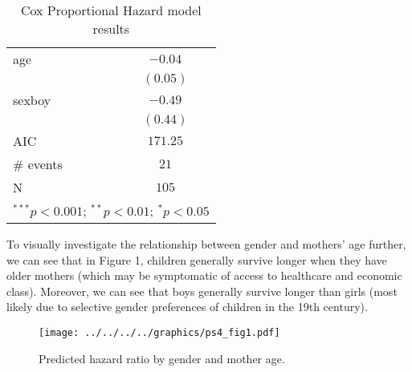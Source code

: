 \documentclass[12pt,letterpaper]{article}
\begin{document}
		\begin{table}[h!]
		\caption{\footnotesize Cox Proportional Hazard model results}
		\vspace{.25cm}
		\label{table:coefficients}
		\centering
		\begin{adjustbox}{width=.3\textwidth}
			\begin{tabular}{l c}
				\hline
			age         & $-0.04$  \\
            & $(0.05)$ \\
sexboy      & $-0.49$  \\
            & $(0.44)$ \\
\hline
AIC         & $171.25$ \\
\# events & $21$     \\
N   & $105$    \\

				\hline
				\multicolumn{2}{l}{\footnotesize{$^{***}p<0.001$; $^{**}p<0.01$; $^{*}p<0.05$}}
			\end{tabular}
		\end{adjustbox}
	\end{table}
	
	To visually investigate the relationship between gender and mothers’ age further, we can see that in Figure 1, children generally survive longer when they have older mothers (which may be symptomatic of access to healthcare and economic class). Moreover, we can see that boys generally survive longer than girls (most likely due to selective gender preferences of children in the 19th century).
	
		
	\begin{figure}[h!]\centering
		\caption{\footnotesize Predicted hazard ratio by gender and mother age.}%
		\label{fig:coxph}
				\vspace{.25cm}
		\texttt{[image: ../../../../graphics/ps4\_fig1.pdf]}\\
	\end{figure}
\end{document}
